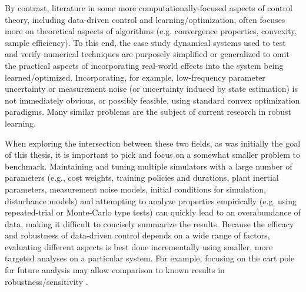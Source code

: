 By contrast, literature in some more computationally-focused aspects of control theory, including data-driven control and learning/optimization, often focuses more on theoretical aspects of algorithms (e.g. convergence properties, convexity, sample efficiency).  To this end, the case study dynamical systems used to test and verify numerical techniques are purposely simplified or generalized to omit the practical aspects of incorporating real-world effects into the system being learned/optimized.  Incorporating, for example, low-frequency parameter uncertainty or measurement noise (or uncertainty induced by state estimation) is not immediately obvious, or possibly feasible, using standard convex optimization paradigms.  Many similar problems are the subject of current research in robust learning.

When exploring the intersection between these two fields, as was initially the goal of this thesis, it is important to pick and focus on a somewhat smaller problem to benchmark.  Maintaining and tuning multiple simulators with a large number of parameters (e.g., cost weights, training policies and durations, plant inertial parameters, measurement noise models, initial conditions for simulation, disturbance models) and attempting to analyze properties empirically (e.g. using repeated-trial or Monte-Carlo type tests) can quickly lead to an overabundance of data, making it difficult to concisely summarize the results.  Because the efficacy and robustness of data-driven control depends on a wide range of factors, evaluating different aspects is best done incrementally using smaller, more targeted analyses on a particular system.  For example, focusing on the cart pole for future analysis may allow comparison to known results in robustness/sensitivity \cite{leong2016understanding,bernat2020driver}.

